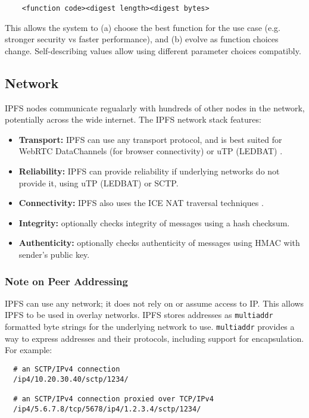 \documentclass{sig-alternate}
\begin{document}
\begin{verbatim}
    <function code><digest length><digest bytes>
\end{verbatim}

This allows the system to (a) choose the best function for the use case (e.g. stronger security vs faster performance), and (b) evolve as function choices change. Self-describing values allow using different parameter choices compatibly.

\subsection{Network}

IPFS nodes communicate regualarly with hundreds of other nodes in the network, potentially across the wide internet. The IPFS network stack features:

\begin{itemize}
  \item \textbf{Transport:} IPFS can use any transport protocol, and is best suited for WebRTC DataChannels \cite{WebRTC} (for browser connectivity) or uTP \cite{uTP} (LEDBAT) \cite{LEDBAT}.
  \item \textbf{Reliability:} IPFS can provide reliability if underlying networks do not provide it, using uTP (LEDBAT) \cite{LEDBAT} or SCTP.
  \item \textbf{Connectivity:} IPFS also uses the ICE NAT traversal techniques \cite{ICE}.
  \item \textbf{Integrity:} optionally checks integrity of messages using a hash checksum.
  \item \textbf{Authenticity:} optionally checks authenticity of messages using HMAC with sender's public key.
\end{itemize}

\subsubsection{Note on Peer Addressing}

IPFS can use any network; it does not rely on or assume access to IP. This allows IPFS to be used in overlay networks. IPFS stores addresses as \texttt{multiaddr} formatted byte strings for the underlying network to use. \texttt{multiaddr} provides a way to express addresses and their protocols, including support for encapsulation. For example:

\begin{verbatim}
  # an SCTP/IPv4 connection
  /ip4/10.20.30.40/sctp/1234/

  # an SCTP/IPv4 connection proxied over TCP/IPv4
  /ip4/5.6.7.8/tcp/5678/ip4/1.2.3.4/sctp/1234/
\end{verbatim}
\end{document}
